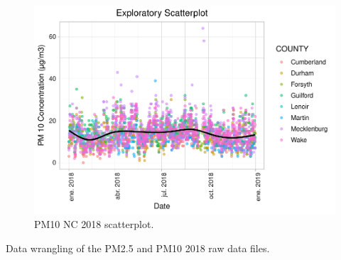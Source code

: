 \documentclass[12pt,]{article}
\begin{document}
\begin{figure}
\centering
\includegraphics{./Outputunnamed-chunk-14-1.pdf}
\caption{PM10 NC 2018 scatterplot. \label{PM10_scatterplot}}
\end{figure}

Data wrangling of the PM2.5 and PM10 2018 raw data files.
\end{document}
